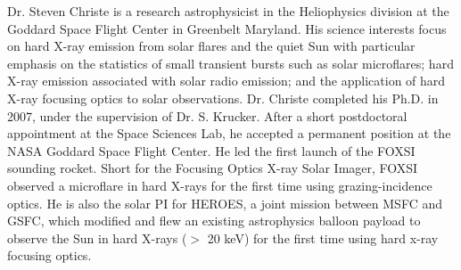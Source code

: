 Dr. Steven Christe is a research astrophysicist in the Heliophysics division at the Goddard Space Flight 
Center in Greenbelt Maryland.  His science interests focus on hard X-ray emission from solar flares and 
the quiet Sun with particular emphasis on the statistics of small transient bursts such as solar
microflares; hard X-ray emission associated with solar radio emission; and the application of hard X-ray
focusing optics to solar observations.  Dr. Christe completed his Ph.D. in 2007, under the supervision of 
Dr. S. Krucker.  After a short postdoctoral appointment at the Space Sciences Lab, he accepted a permanent 
position at the NASA Goddard Space Flight Center.  He led the first launch of the FOXSI sounding rocket.
Short for the Focusing Optics X-ray Solar Imager, FOXSI observed a microflare in hard X-rays for the first 
time using grazing-incidence optics. He is also the solar PI for HEROES, a joint mission between MSFC and
GSFC, which modified and flew an existing astrophysics balloon payload to observe the Sun in hard X-rays
($>$ 20 keV) for the first time using hard x-ray focusing optics.